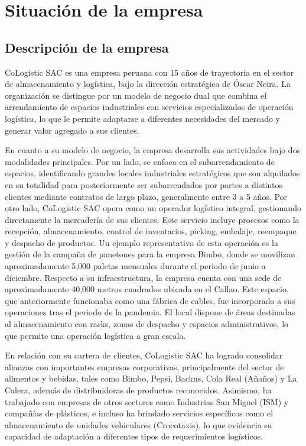\documentclass[11pt]{article}
\begin{document}
\newpage
{}
\thispagestyle{plain}
\tableofcontents
\newpage

\setcounter{page}{1}

\section{Situación de la empresa}

\subsection{Descripción de la empresa}

CoLogistic SAC es una empresa peruana con 15 años de trayectoria en el
sector de almacenamiento y logística, bajo la dirección estratégica de
Óscar Neira. La organización se distingue por un modelo de negocio dual
que combina el arrendamiento de espacios industriales con servicios
especializados de operación logística, lo que le permite adaptarse a
diferentes necesidades del mercado y generar valor agregado a sus
clientes.

En cuanto a su modelo de negocio, la empresa desarrolla sus actividades
bajo dos modalidades principales. Por un lado, se enfoca en el
subarrendamiento de espacios, identificando grandes locales industriales
estratégicos que son alquilados en su totalidad para posteriormente ser
subarrendados por partes a distintos clientes mediante contratos de
largo plazo, generalmente entre 3 a 5 años. Por otro lado, CoLogistic
SAC opera como un operador logístico integral, gestionando directamente
la mercadería de sus clientes. Este servicio incluye procesos como la
recepción, almacenamiento, control de inventarios, picking, embalaje,
reempaque y despacho de productos. Un ejemplo representativo de esta
operación es la gestión de la campaña de panetones para la empresa
Bimbo, donde se movilizan aproximadamente 5,000 paletas mensuales
durante el periodo de junio a diciembre. Respecto a su infraestructura,
la empresa cuenta con una sede de aproximadamente 40,000 metros
cuadrados ubicada en el Callao. Este espacio, que anteriormente
funcionaba como una fábrica de cables, fue incorporado a sus operaciones
tras el periodo de la pandemia. El local dispone de áreas destinadas al
almacenamiento con racks, zonas de despacho y espacios administrativos,
lo que permite una operación logística a gran escala.

En relación con su cartera de clientes, CoLogistic SAC ha logrado
consolidar alianzas con importantes empresas corporativas,
principalmente del sector de alimentos y bebidas, tales como Bimbo,
Pepsi, Backus, Cola Real (Añaños) y La Calera, además de distribuidoras
de productos reconocidos. Asimismo, ha trabajado con empresas de otros
sectores como Industrias San Miguel (ISM) y compañías de plásticos, e
incluso ha brindado servicios específicos como el almacenamiento de
unidades vehiculares (Crocotaxis), lo que evidencia su capacidad de
adaptación a diferentes tipos de requerimientos logísticos.
\end{document}
